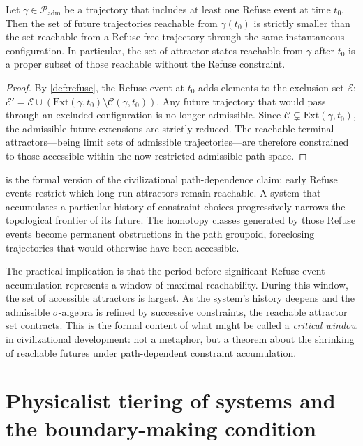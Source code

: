 \documentclass[12pt, oneside]{memoir}
\newcommand{\Padm}{\mathcal{P}_{\mathrm{adm}}}
\begin{document}
\begin{proposition}
\label{prop:attractor-irrev}
Let $\gamma \in \Padm$ be a trajectory that includes at least one Refuse event at time
$t_0$.  Then the set of future trajectories reachable from $\gamma(t_0)$ is strictly
smaller than the set reachable from a Refuse-free trajectory through the same instantaneous
configuration.  In particular, the set of attractor states reachable from $\gamma$ after
$t_0$ is a proper subset of those reachable without the Refuse constraint.
\end{proposition}

\begin{proof}
By \cref{def:refuse}, the Refuse event at $t_0$ adds elements to the exclusion set
$\mathcal{E}$: $\mathcal{E}' = \mathcal{E} \cup (\mathrm{Ext}(\gamma,t_0) \setminus
\mathcal{C}(\gamma,t_0))$.  Any future trajectory that would pass through an excluded
configuration is no longer admissible.  Since $\mathcal{C} \subsetneq
\mathrm{Ext}(\gamma,t_0)$, the admissible future extensions are strictly reduced.  The
reachable terminal attractors---being limit sets of admissible trajectories---are
therefore constrained to those accessible within the now-restricted admissible path space.
\end{proof}

 is the formal version of the civilizational path-dependence
claim: early Refuse events restrict which long-run attractors remain reachable.  A system
that accumulates a particular history of constraint choices progressively narrows the
topological frontier of its future.  The homotopy classes generated by those Refuse
events become permanent obstructions in the path groupoid, foreclosing trajectories that
would otherwise have been accessible.

The practical implication is that the period before significant Refuse-event accumulation
represents a window of maximal reachability.  During this window, the set of accessible
attractors is largest.  As the system's history deepens and the admissible $\sigma$-algebra
is refined by successive constraints, the reachable attractor set contracts.  This is the
formal content of what might be called a \emph{critical window} in civilizational
development: not a metaphor, but a theorem about the shrinking of reachable futures under
path-dependent constraint accumulation.

\section{Physicalist tiering of systems and the boundary-making condition}
\label{sec:tiering}
\end{document}
